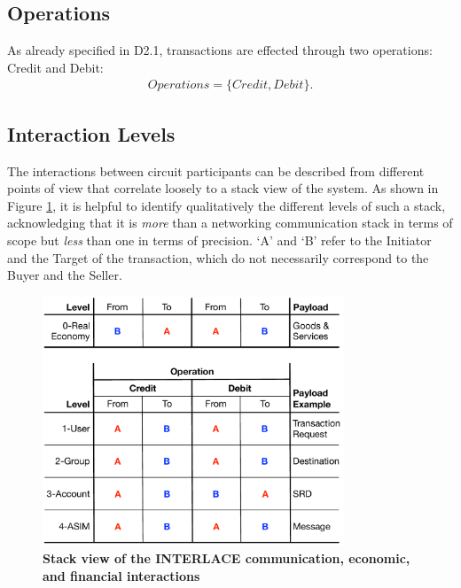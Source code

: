 \subsection{Operations}
As already specified in D2.1, transactions are effected through two operations: Credit and Debit:
\begin{align}
Operations = \{ Credit, Debit \}.
\end{align}

\subsection{Interaction Levels}
The interactions between circuit participants can be described from different points of view that correlate loosely to a stack view of the system. As shown in Figure \ref{fig:stack}, it is helpful to identify qualitatively the different levels of such a stack, acknowledging that it is \emph{more} than a networking communication stack in terms of scope but \emph{less} than one in terms of precision. `A' and `B' refer to the Initiator and the Target of the transaction, which do not necessarily correspond to the Buyer and the Seller.

\begin{figure}[htbp]
\centering
\includegraphics[width=9cm]{Figures/Stack}
\caption{\small\textbf{Stack view of the INTERLACE communication, economic, and financial  interactions}}
\label{fig:stack}
\end{figure}
\vspace{-0.5cm}


